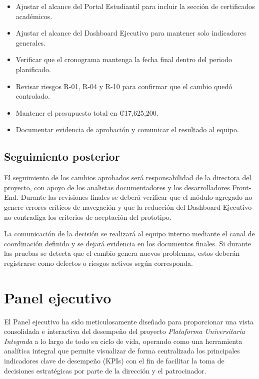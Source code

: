 \documentclass[11pt,spanish]{article}
\begin{document}
\begin{itemize}[leftmargin=*, label={\textbullet}]
    \item Ajustar el alcance del Portal Estudiantil para incluir la sección de certificados académicos.
    \item Ajustar el alcance del Dashboard Ejecutivo para mantener solo indicadores generales.
    \item Verificar que el cronograma mantenga la fecha final dentro del periodo planificado.
    \item Revisar riesgos R-01, R-04 y R-10 para confirmar que el cambio quedó controlado.
    \item Mantener el presupuesto total en ₡17,625,200.
    \item Documentar evidencia de aprobación y comunicar el resultado al equipo.
\end{itemize}

\subsection{Seguimiento posterior}

El seguimiento de los cambios aprobados será responsabilidad de la directora del proyecto, con apoyo de los analistas documentadores y los desarrolladores Front-End. Durante las revisiones finales se deberá verificar que el módulo agregado no genere errores críticos de navegación y que la reducción del Dashboard Ejecutivo no contradiga los criterios de aceptación del prototipo.

La comunicación de la decisión se realizará al equipo interno mediante el canal de coordinación definido y se dejará evidencia en los documentos finales. Si durante las pruebas se detecta que el cambio genera nuevos problemas, estos deberán registrarse como defectos o riesgos activos según corresponda.


\newpage
\section{Panel ejecutivo}

El Panel ejecutivo ha sido meticulosamente diseñado para proporcionar una vista consolidada e interactiva del desempeño del proyecto \textit{Plataforma Universitaria Integrada} a lo largo de todo su ciclo de vida, operando como una herramienta analítica integral que permite visualizar de forma centralizada los principales indicadores clave de desempeño (KPIs) con el fin de facilitar la toma de decisiones estratégicas por parte de la dirección y el patrocinador.
\end{document}
